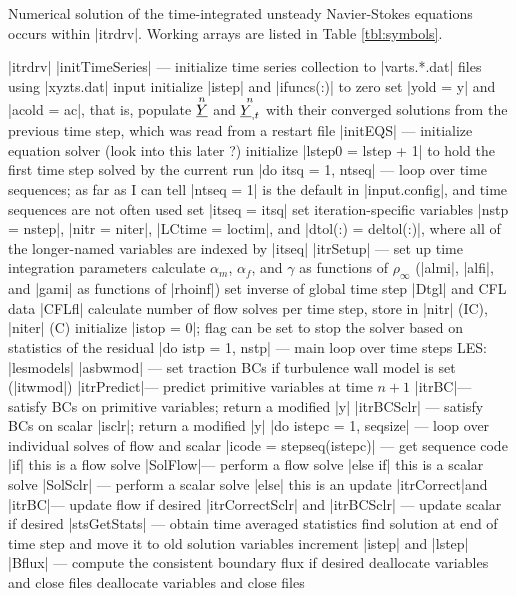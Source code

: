 \documentclass[11pt]{article}
\begin{document}
Numerical solution of the time-integrated unsteady Navier-Stokes equations occurs within |itrdrv|. Working arrays are listed in Table \ref{tbl:symbols}.
\begin{outline}[deep]
\1 |itrdrv|
	\2 |initTimeSeries| --- initialize time series collection to |varts.*.dat| files using |xyzts.dat| input
	\2 initialize |istep| and |ifuncs(:)| to zero
	\2 set |yold = y| and |acold = ac|, that is, populate $\oset{n}{\ul{Y}}$ and $\oset{n}{\ul{Y}_{,t}}$ with their converged solutions from the previous time step, which was read from a restart file
	\2 |initEQS| --- initialize equation solver (look into this later \ra?)
	\2 initialize |lstep0 = lstep + 1| to hold the first time step solved by the current run
	\2 |do itsq = 1, ntseq| --- loop over time sequences; as far as I can tell |ntseq = 1| is the default in |input.config|, and time sequences are not often used
		\3 set |itseq = itsq|
		\3 set iteration-specific variables |nstp = nstep|, |nitr = niter|, |LCtime = loctim|, and |dtol(:) = deltol(:)|, where all of the longer-named variables are indexed by |itseq|
		\3 |itrSetup| --- set up time integration parameters
			\4 calculate $\alpha_m$, $\alpha_f$, and $\gamma$ as functions of $\rho_\infty$ (|almi|, |alfi|, and |gami| as functions of |rhoinf|)
			\4 set inverse of global time step |Dtgl| and CFL data |CFLfl|
		\3 calculate number of flow solves per time step, store in |nitr| (IC), |niter| (C)
		\3 initialize |istop = 0|; flag can be set to stop the solver based on statistics of the residual
		\3 |do istp = 1, nstp| --- main loop over time steps
			\4 LES: |lesmodels|
			\4 |asbwmod| --- set traction BCs if turbulence wall model is set (|itwmod|)
			\4 |itrPredict|\ra --- predict primitive variables at time $n+1$
			\4 |itrBC|\ra --- satisfy BCs on primitive variables; return a modified |y|
			\4 |itrBCSclr| --- satisfy BCs on scalar |isclr|; return a modified |y|
			\4 |do istepc = 1, seqsize| --- loop over individual solves of flow and scalar
				\5 |icode = stepseq(istepc)| --- get sequence code
				\5 |if| this is a flow solve
					\6 |SolFlow|\ra --- perform a flow solve
				\5 |else if| this is a scalar solve
					\6 |SolSclr| --- perform a scalar solve
				\5 |else| this is an update
					\6 |itrCorrect|\ra and |itrBC|\ra --- update flow if desired
					\6 |itrCorrectSclr| and |itrBCSclr| --- update scalar if desired
			\4 |stsGetStats| --- obtain time averaged statistics
			\4 find solution at end of time step and move it to old solution variables
			\4 increment |istep| and |lstep|
			\4 |Bflux| --- compute the consistent boundary flux if desired
		\3 deallocate variables and close files
	\2 deallocate variables and close files
\end{outline}
\end{document}
